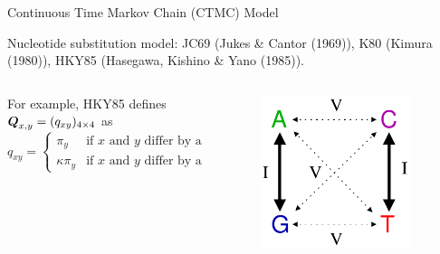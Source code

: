 \documentclass{beamer}
\begin{document}
\begin{frame}{Continuous Time Markov Chain (CTMC) Model}

\vspace{0.2cm}
Nucleotide substitution model: JC69
(Jukes \& Cantor (1969)), K80 (Kimura (1980)),
HKY85 (Hasegawa, Kishino \& Yano (1985)).
\\
\begin{columns}

\begin{column}{0.8\textwidth}
\hspace{0.1cm}
For example, HKY85 defines
$\boldsymbol{Q}_{x,y} = (q_{xy})_{4\times 4}$ as
\[
q_{xy} =
\left\{
\begin{array}{ll}
  \pi_y & \mbox{if $x$ and $y$ differ by a transversion (V),}      \\
  \kappa \pi_y & \mbox{if $x$ and $y$ differ by a transition (I),}
\end{array}
\right.
\]
\end{column}

\hspace{-0.5cm}

\begin{column}{0.2\textwidth}
\begin{figure}
  \includegraphics[width=0.9\textwidth]{./graph/IV_figure}
\end{figure}
\end{column}


\end{columns}
\end{frame}
\end{document}
